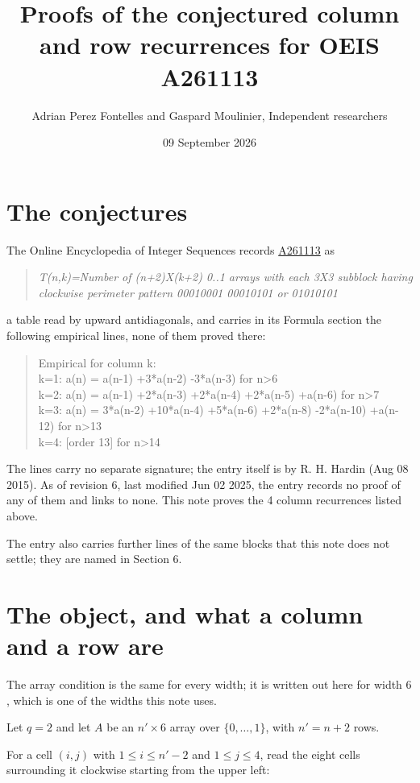 \documentclass[11pt]{article}
\title{Proofs of the conjectured column and row recurrences for OEIS A261113}
\author{Adrian Perez Fontelles and Gaspard Moulinier, Independent researchers}
\date{09 September 2026}
\theoremstyle{definition}
\begin{document}
\maketitle
\section{The conjectures}

The Online Encyclopedia of Integer Sequences records \href{https://oeis.org/A261113}{A261113} as

\begin{quote}\itshape T(n,k)=Number of (n+2)X(k+2) 0..1 arrays with each 3X3 subblock having clockwise perimeter pattern 00010001 00010101 or 01010101\end{quote}

a table read by upward antidiagonals, and carries in its Formula section the following empirical lines, none of them proved there:

\begin{quote}\ttfamily Empirical for column k:\\
k=1: a(n) = a(n-1) +3*a(n-2) -3*a(n-3) for n>6\\k=2: a(n) = a(n-1) +2*a(n-3) +2*a(n-4) +2*a(n-5) +a(n-6) for n>7\\k=3: a(n) = 3*a(n-2) +10*a(n-4) +5*a(n-6) +2*a(n-8) -2*a(n-10) +a(n-12) for n>13\\k=4: [order 13] for n>14\end{quote}

The lines carry no separate signature; the entry itself is by R. H. Hardin (Aug 08 2015). As of revision 6, last modified Jun 02 2025, the entry records no proof of any of them and links to none. This note proves the 4 column recurrences listed above.

The entry also carries further lines of the same blocks that this note does not settle; they are named in Section 6.

\section{The object, and what a column and a row are}

The array condition is the same for every width; it is written out here for width $6$, which is one of the widths this note uses.

Let $q = 2$ and let $A$ be an $n' \times 6$ array over $\{0,\dots,1\}$, with $n' = n + 2$ rows.

For a cell $(i,j)$ with $1 \le i \le n'-2$ and $1 \le j \le 4$, read the eight cells surrounding it clockwise starting from the upper left:
\end{document}

